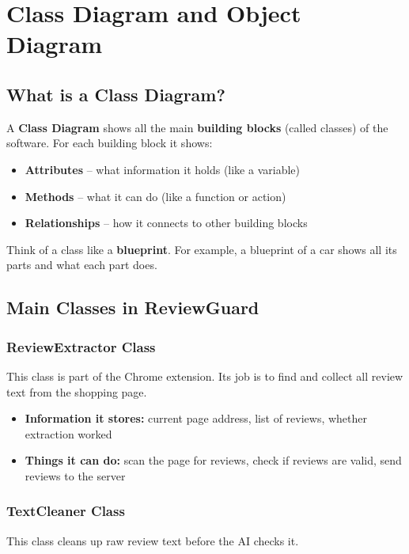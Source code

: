 \documentclass[10pt, a4paper]{report}
\begin{document}
\chapter{Class Diagram and Object Diagram}

\section{What is a Class Diagram?}

A \textbf{Class Diagram} shows all the main \textbf{building blocks} (called classes) of the software. For each building block it shows:
\begin{itemize}
  \item \textbf{Attributes} -- what information it holds (like a variable)
  \item \textbf{Methods} -- what it can do (like a function or action)
  \item \textbf{Relationships} -- how it connects to other building blocks
\end{itemize}

Think of a class like a \textbf{blueprint}. For example, a blueprint of a car shows all its parts and what each part does.

\section{Main Classes in ReviewGuard}

\subsection{ReviewExtractor Class}
This class is part of the Chrome extension. Its job is to find and collect all review text from the shopping page.

\begin{itemize}
  \item \textbf{Information it stores:} current page address, list of reviews, whether extraction worked
  \item \textbf{Things it can do:} scan the page for reviews, check if reviews are valid, send reviews to the server
\end{itemize}

\subsection{TextCleaner Class}
This class cleans up raw review text before the AI checks it.
\end{document}
